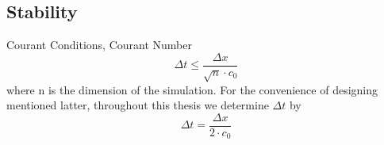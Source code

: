 \subsection{Stability}
Courant Conditions, Courant Number
\begin{equation}
  \Delta t \le \frac{\Delta x}{\sqrt{n}\cdot c_0}
\end{equation}
where n is the dimension of the simulation. For the convenience of designing mentioned latter, throughout this thesis we determine
$\Delta t$ by
\begin{equation}
  \Delta t = \frac{\Delta x}{2 \cdot c_0}
\end{equation}
